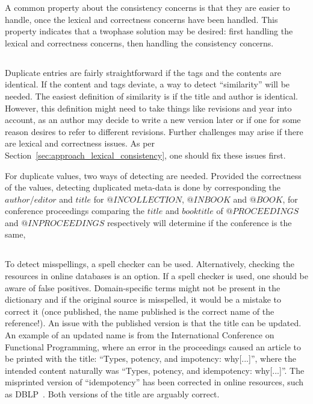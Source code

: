 A common property about the consistency concerns is that they are
easier to handle, once the lexical and correctness concerns have been
handled.  This property indicates that a twophase solution may be
desired: first handling the lexical and correctness concerns, then
handling the consistency concerns.


\subsection{}
\label{sec:approach_duplicates}

Duplicate entries are fairly straightforward if the tags and the
contents are identical.  If the content and tags deviate, a way to
detect ``similarity'' will be needed.  The easiest definition of
similarity is if the title and author is identical.  However, this
definition might need to take things like revisions and year into
account, as an author may decide to write a new version later or if
one for some reason desires to refer to different revisions.  Further
challenges may arise if there are lexical and correctness issues.  As
per Section~\ref{sec:approach_lexical_consistency}, one should fix
these issues first.

For duplicate values, two ways of detecting are needed.  Provided the
correctness of the values, detecting duplicated meta-data is done by
corresponding the $author$/$editor$ and $title$ for $@INCOLLECTION$,
$@INBOOK$ and $@BOOK$, for conference proceedings comparing the
$title$ and $booktitle$ of $@PROCEEDINGS$ and $@INPROCEEDINGS$
respectively will determine if the conference is the same,


\subsection{}

To detect misspellings, a spell checker can be used.  Alternatively,
checking the resources in online databases is an option.  If a spell
checker is used, one should be aware of false positives.
Domain-specific terms might not be present in the dictionary and if
the original source is misspelled, it would be a mistake to correct it
(once published, the name published is the correct name of the
reference!).  An issue with the published version is that the title
can be updated.  An example of an updated name is from the
International Conference on Functional Programming, where an error in
the proceedings caused an article to be printed with the title:
``Types, potency, and impotency: why[...]'', where the intended
content naturally was ``Types, potency, and idempotency: why[...]''.
The misprinted version of ``idempotency'' has been corrected in online
resources, such as DBLP~\cite{bibtex2006_dblp}. Both versions of the
title are arguably correct.

